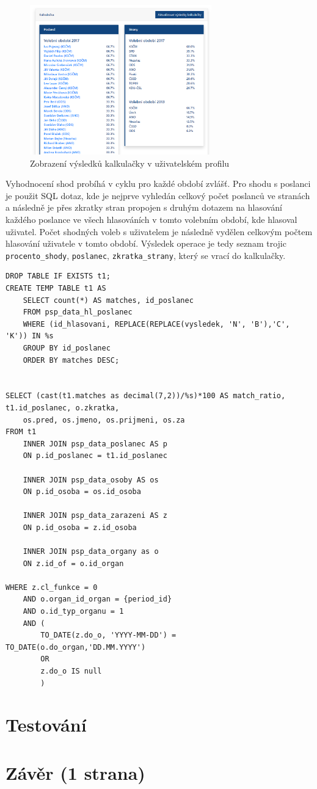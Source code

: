 \begin{figure}
    \centering
    \includegraphics[width=0.7\textwidth]{obrazky-figures/aplikace-kalkulacka.png}
    \caption{Zobrazení výsledků kalkulačky v uživatelském profilu}
    \label{fig:aplikace-kalkulacka}
\end{figure}

\par Vyhodnocení shod probíhá v cyklu pro každé období zvlášť. Pro shodu s poslanci je použit SQL dotaz, kde je nejprve vyhledán celkový počet poslanců ve stranách a následně je přes zkratky stran propojen s druhým dotazem na hlasování každého poslance ve všech hlasováních v tomto volebním období, kde hlasoval uživatel. Počet shodných voleb s uživatelem je následně vydělen celkovým počtem hlasování uživatele v tomto období. Výsledek operace je tedy seznam trojic \texttt{procento\_shody}, \texttt{poslanec}, \texttt{zkratka\_strany}, který se vrací do kalkulačky.
\begin{verbatim}
DROP TABLE IF EXISTS t1;
CREATE TEMP TABLE t1 AS   
    SELECT count(*) AS matches, id_poslanec 
    FROM psp_data_hl_poslanec
    WHERE (id_hlasovani, REPLACE(REPLACE(vysledek, 'N', 'B'),'C', 'K')) IN %s
    GROUP BY id_poslanec 
    ORDER BY matches DESC;


SELECT (cast(t1.matches as decimal(7,2))/%s)*100 AS match_ratio, t1.id_poslanec, o.zkratka, 
    os.pred, os.jmeno, os.prijmeni, os.za
FROM t1
    INNER JOIN psp_data_poslanec AS p
    ON p.id_poslanec = t1.id_poslanec

    INNER JOIN psp_data_osoby AS os
    ON p.id_osoba = os.id_osoba

    INNER JOIN psp_data_zarazeni AS z 
    ON p.id_osoba = z.id_osoba

    INNER JOIN psp_data_organy as o
    ON z.id_of = o.id_organ

WHERE z.cl_funkce = 0
    AND o.organ_id_organ = {period_id}
    AND o.id_typ_organu = 1
    AND (
		TO_DATE(z.do_o, 'YYYY-MM-DD') = TO_DATE(o.do_organ,'DD.MM.YYYY')
		OR 
        z.do_o IS null
		)
\end{verbatim}

\chapter{Testování}
\label{chap:testovani}


\chapter{Závěr (1 strana)}
\label{chap:zaver}